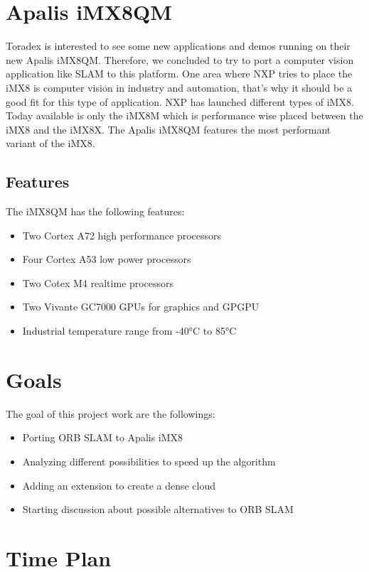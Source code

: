 \documentclass[11pt,a4paper,titlepage,oneside]{report}
\begin{document}
\section{Apalis iMX8QM}

Toradex is interested to see some new applications and demos running on their new Apalis iMX8QM. Therefore, we concluded to try to port a computer vision application like SLAM to this platform. One area where NXP tries to place the iMX8 is computer vision in industry and automation, that's why it should be a good fit for this type of application. NXP has launched different types of iMX8. Today available is only the iMX8M which is performance wise placed between the iMX8 and the iMX8X. The Apalis iMX8QM features the most performant variant of the iMX8.

\subsection{Features}

The iMX8QM has the following features:
\begin{itemize}
  \item Two Cortex A72 high performance processors
  \item Four Cortex A53 low power processors
  \item Two Cotex M4 realtime processors 
  \item Two Vivante GC7000 GPUs for graphics and GPGPU
  \item Industrial temperature range from -40°C to 85°C
\end{itemize}

\section{Goals}
The goal of this project work are the followings:
\begin{itemize}
\item Porting ORB SLAM to Apalis iMX8
\item Analyzing different possibilities to speed up the algorithm
\item Adding an extension to create a dense cloud
\item Starting discussion about possible alternatives to ORB SLAM
\end{itemize}

\section{Time Plan}
\end{document}
